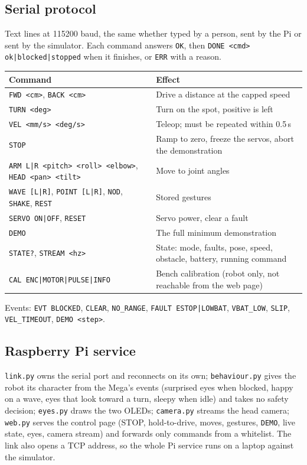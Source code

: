 \documentclass[11pt,a4paper]{article}
\newcommand{\file}[1]{{\small\nolinkurl{#1}}}
\begin{document}
\subsection{Serial protocol}
Text lines at 115200 baud, the same whether typed by a person, sent by the Pi or sent by the simulator. Each command answers \texttt{OK}, then \texttt{DONE <cmd> ok|blocked|stopped} when it finishes, or \texttt{ERR} with a reason.
\begin{table}[H]\small
\begin{tabularx}{\linewidth}{@{}P{62mm}L@{}}
\toprule
\textbf{Command} & \textbf{Effect}\\
\midrule
\texttt{FWD <cm>}, \texttt{BACK <cm>} & Drive a distance at the capped speed\\
\texttt{TURN <deg>} & Turn on the spot, positive is left\\
\texttt{VEL <mm/s> <deg/s>} & Teleop; must be repeated within 0.5\,s\\
\texttt{STOP} & Ramp to zero, freeze the servos, abort the demonstration\\
\texttt{ARM L|R <pitch> <roll> <elbow>}, \texttt{HEAD <pan> <tilt>} & Move to joint angles\\
\texttt{WAVE [L|R]}, \texttt{POINT [L|R]}, \texttt{NOD}, \texttt{SHAKE}, \texttt{REST} & Stored gestures\\
\texttt{SERVO ON|OFF}, \texttt{RESET} & Servo power, clear a fault\\
\texttt{DEMO} & The full minimum demonstration\\
\texttt{STATE?}, \texttt{STREAM <hz>} & State: mode, faults, pose, speed, obstacle, battery, running command\\
\texttt{CAL ENC|MOTOR|PULSE|INFO} & Bench calibration (robot only, not reachable from the web page)\\
\bottomrule
\end{tabularx}
\end{table}
Events: \texttt{EVT BLOCKED}, \texttt{CLEAR}, \texttt{NO\_RANGE}, \texttt{FAULT ESTOP|LOWBAT}, \texttt{VBAT\_LOW}, \texttt{SLIP}, \texttt{VEL\_TIMEOUT}, \texttt{DEMO <step>}.

\subsection{Raspberry Pi service}
\file{link.py} owns the serial port and reconnects on its own; \file{behaviour.py} gives the robot its character from the Mega's events (surprised eyes when blocked, happy on a wave, eyes that look toward a turn, sleepy when idle) and takes no safety decision; \file{eyes.py} draws the two OLEDs; \file{camera.py} streams the head camera; \file{web.py} serves the control page (STOP, hold-to-drive, moves, gestures, \texttt{DEMO}, live state, eyes, camera stream) and forwards only commands from a whitelist. The link also opens a TCP address, so the whole Pi service runs on a laptop against the simulator.
\end{document}
